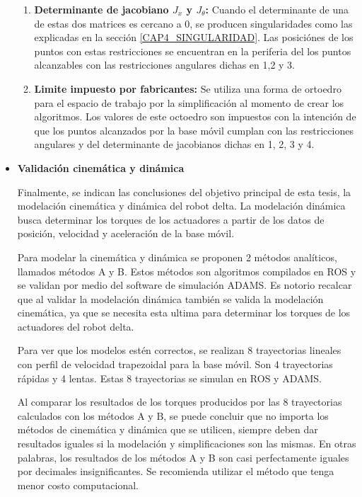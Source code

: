 \begin{itemize}
{\begin{enumerate}
                    \item{\textbf{Determinante de jacobiano $J_{x}$ y $J_{\theta}$: } Cuando el determinante de una de estas dos matrices es cercano a 0, se producen singularidades como las explicadas en la sección \eqref{CAP4_SINGULARIDAD}. Las posiciónes de los puntos con estas restricciones se encuentran en la periferia del los puntos alcanzables con las restricciones angulares dichas en 1,2 y 3.} 
                    \item{\textbf{Limite impuesto por fabricantes: } Se utiliza una forma de ortoedro para el espacio de trabajo por la simplificación al momento de crear los algoritmos. Los valores de este octoedro son impuestos con la intención de que los puntos alcanzados por la base móvil cumplan con las restricciones angulares y del determinante de jacobianos dichas  en 1, 2, 3 y 4.  }
                \end{enumerate}  
            }
            \item {\textbf{Validación cinemática y dinámica} 
            
            Finalmente, se indican las conclusiones del objetivo principal de esta tesis, la modelación cinemática y dinámica del robot delta. La modelación dinámica busca determinar los torques de los actuadores a partir de los datos de posición, velocidad y aceleración de la base móvil.
            
            Para modelar la cinemática y dinámica se proponen 2 métodos analíticos, llamados métodos A y B. Estos métodos son algoritmos compilados en ROS y se validan por medio del software de simulación ADAMS. Es notorio recalcar que al validar la modelación dinámica también se valida la modelación cinemática, ya que se necesita esta ultima para determinar los torques de los actuadores del robot delta.
            
            Para ver que los modelos estén correctos, se realizan 8 trayectorias lineales con perfil de velocidad trapezoidal para la base móvil. Son 4 trayectorias rápidas y 4 lentas. Estas 8 trayectorias se simulan en ROS y ADAMS.
            
            Al comparar los resultados de los torques producidos por las 8 trayectorias calculados con los métodos A y B, se puede concluir que no importa los métodos de cinemática y dinámica que se utilicen, siempre deben dar resultados iguales si la modelación y simplificaciones son las mismas. En otras palabras, los resultados de los métodos A y B son casi perfectamente iguales por decimales insignificantes. Se recomienda utilizar el método que tenga menor costo computacional. 
            
}
\end{itemize}
